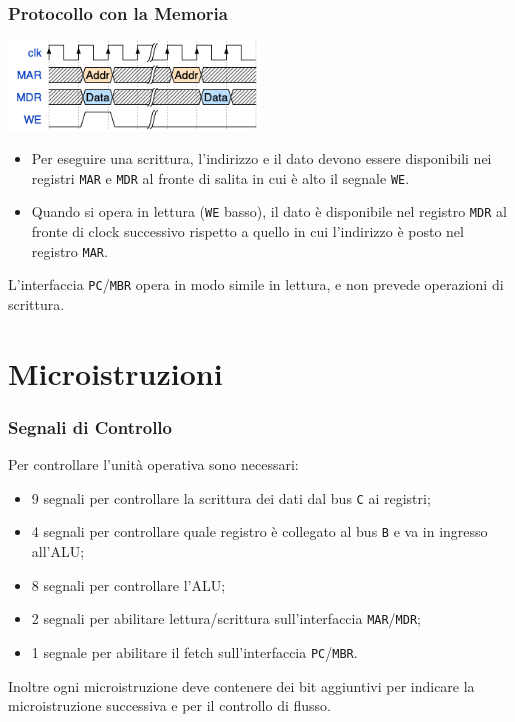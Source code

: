 \documentclass{beamer}
\begin{document}
\begin{frame}
  \frametitle{Protocollo con la Memoria}
  \begin{center}
    \includegraphics[width=0.5\textwidth]{mem_prot.png}
  \end{center}
  \begin{itemize}
    \item Per eseguire una scrittura, l'indirizzo e il dato devono essere
    disponibili nei registri \lstinline{MAR} e \lstinline{MDR} al fronte di
    salita in cui è alto il segnale \lstinline{WE}.
    \item Quando si opera in lettura (\lstinline{WE} basso), il dato è
    disponibile nel registro \lstinline{MDR} al fronte di clock successivo
    rispetto a quello in cui l'indirizzo è posto nel registro \lstinline{MAR}.
  \end{itemize}
  L'interfaccia \lstinline{PC}/\lstinline{MBR} opera in modo simile in lettura,
  e non prevede operazioni di scrittura.
\end{frame}

\section{Microistruzioni}
\begin{frame}
  \frametitle{Segnali di Controllo}
  Per controllare l'unità operativa sono necessari:
  \begin{itemize}
    \item 9 segnali per controllare la scrittura dei dati dal bus \lstinline{C}
    ai registri;
    \item 4 segnali per controllare quale registro è collegato al bus
    \lstinline{B} e va in ingresso all'ALU;
    \item 8 segnali per controllare l'ALU;
    \item 2 segnali per abilitare lettura/scrittura sull'interfaccia
    \lstinline{MAR}/\lstinline{MDR};
    \item 1 segnale per abilitare il fetch sull'interfaccia
    \lstinline{PC}/\lstinline{MBR}.
  \end{itemize}
  Inoltre ogni microistruzione deve contenere dei bit aggiuntivi per indicare la
  microistruzione successiva e per il controllo di flusso.
\end{frame}
\end{document}
